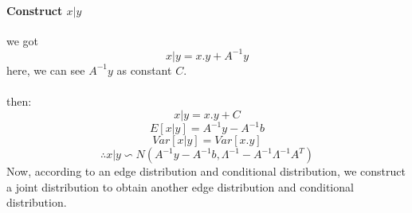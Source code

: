 \documentclass{report}
\begin{document}
\paragraph{Construct $x|y$\\}
we got
$$
x|y = x.y + A^{-1}y
$$
here, we can see $A^{-1}y$ as constant $C$.\\\\
then:
$$
x|y = x.y + C
$$
$$
E[x|y] = A^{-1}y - A^{-1}b
$$
$$
Var[x|y]= Var[x.y]
$$
$$
\therefore x|y \backsim N(A^{-1}y - A^{-1}b, \Lambda^{-1}-A^{-1} \Lambda^{-1}A^T)
$$
Now, according to an edge distribution and conditional distribution, we construct a joint distribution to obtain another edge distribution and conditional distribution.
\end{document}
